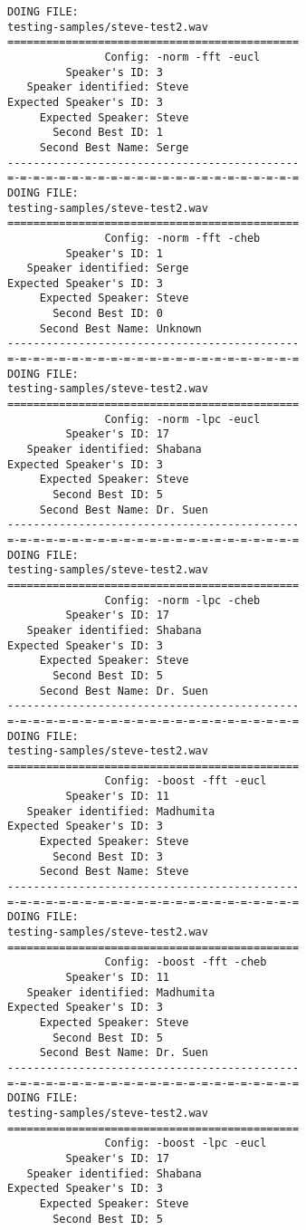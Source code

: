 \begin{verbatim}
DOING FILE:
testing-samples/steve-test2.wav
=============================================
               Config: -norm -fft -eucl
         Speaker's ID: 3
   Speaker identified: Steve
Expected Speaker's ID: 3
     Expected Speaker: Steve
       Second Best ID: 1
     Second Best Name: Serge
---------------------------------------------
=-=-=-=-=-=-=-=-=-=-=-=-=-=-=-=-=-=-=-=-=-=-=
DOING FILE:
testing-samples/steve-test2.wav
=============================================
               Config: -norm -fft -cheb
         Speaker's ID: 1
   Speaker identified: Serge
Expected Speaker's ID: 3
     Expected Speaker: Steve
       Second Best ID: 0
     Second Best Name: Unknown
---------------------------------------------
=-=-=-=-=-=-=-=-=-=-=-=-=-=-=-=-=-=-=-=-=-=-=
DOING FILE:
testing-samples/steve-test2.wav
=============================================
               Config: -norm -lpc -eucl
         Speaker's ID: 17
   Speaker identified: Shabana
Expected Speaker's ID: 3
     Expected Speaker: Steve
       Second Best ID: 5
     Second Best Name: Dr. Suen
---------------------------------------------
=-=-=-=-=-=-=-=-=-=-=-=-=-=-=-=-=-=-=-=-=-=-=
DOING FILE:
testing-samples/steve-test2.wav
=============================================
               Config: -norm -lpc -cheb
         Speaker's ID: 17
   Speaker identified: Shabana
Expected Speaker's ID: 3
     Expected Speaker: Steve
       Second Best ID: 5
     Second Best Name: Dr. Suen
---------------------------------------------
=-=-=-=-=-=-=-=-=-=-=-=-=-=-=-=-=-=-=-=-=-=-=
DOING FILE:
testing-samples/steve-test2.wav
=============================================
               Config: -boost -fft -eucl
         Speaker's ID: 11
   Speaker identified: Madhumita
Expected Speaker's ID: 3
     Expected Speaker: Steve
       Second Best ID: 3
     Second Best Name: Steve
---------------------------------------------
=-=-=-=-=-=-=-=-=-=-=-=-=-=-=-=-=-=-=-=-=-=-=
DOING FILE:
testing-samples/steve-test2.wav
=============================================
               Config: -boost -fft -cheb
         Speaker's ID: 11
   Speaker identified: Madhumita
Expected Speaker's ID: 3
     Expected Speaker: Steve
       Second Best ID: 5
     Second Best Name: Dr. Suen
---------------------------------------------
=-=-=-=-=-=-=-=-=-=-=-=-=-=-=-=-=-=-=-=-=-=-=
DOING FILE:
testing-samples/steve-test2.wav
=============================================
               Config: -boost -lpc -eucl
         Speaker's ID: 17
   Speaker identified: Shabana
Expected Speaker's ID: 3
     Expected Speaker: Steve
       Second Best ID: 5

\end{verbatim}

